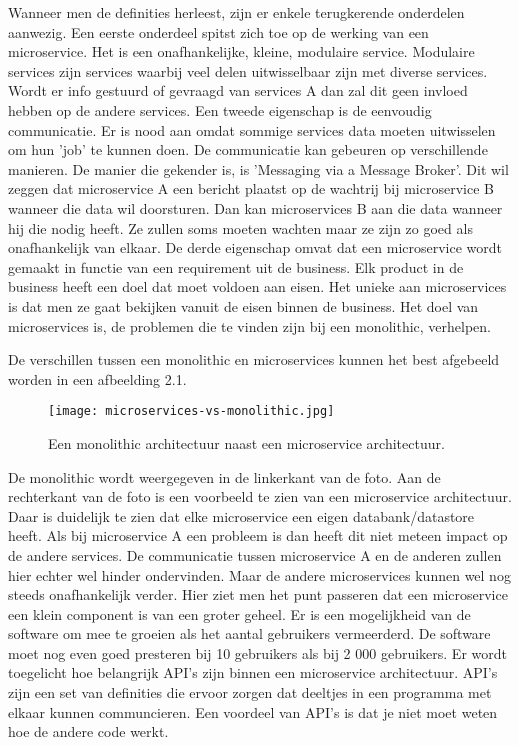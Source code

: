  Wanneer men de definities herleest, zijn er enkele terugkerende onderdelen aanwezig. Een eerste onderdeel spitst zich toe op de  werking van een microservice. Het is een onafhankelijke, kleine, modulaire service. Modulaire services zijn services waarbij veel delen uitwisselbaar zijn met diverse services. Wordt er info gestuurd of gevraagd van services A dan zal dit geen invloed hebben op de andere services. Een tweede eigenschap is de eenvoudig communicatie. Er is nood aan omdat sommige services data moeten uitwisselen om hun 'job' te kunnen doen. De communicatie kan gebeuren op verschillende manieren. De manier die gekender is, is 'Messaging via a Message Broker'. Dit wil zeggen dat microservice A een bericht plaatst op de wachtrij bij microservice B wanneer die data wil doorsturen. Dan kan microservices B aan die data wanneer hij die nodig heeft. Ze zullen soms moeten wachten maar ze zijn zo goed als onafhankelijk van elkaar. De derde eigenschap omvat dat een microservice wordt gemaakt in functie van een requirement uit de business. Elk product in de business heeft een doel dat moet voldoen aan eisen. Het unieke aan microservices is dat  men  ze gaat bekijken vanuit de eisen binnen de business. Het doel van microservices is, de problemen die te vinden zijn bij een monolithic, verhelpen. 
 
 De verschillen tussen een monolithic en microservices kunnen het best afgebeeld worden in een afbeelding 2.1.

\begin{figure}[h]
	\texttt{[image: microservices-vs-monolithic.jpg]}
	\centering
	\caption{Een monolithic architectuur naast een microservice architectuur. \textcite{Watts2018}}
\end{figure}
 De monolithic wordt  weergegeven in de linkerkant van de foto. Aan de rechterkant van de foto is een voorbeeld te zien van een microservice architectuur. Daar is duidelijk te zien dat elke microservice een eigen databank/datastore heeft. 
 Als bij microservice A een probleem is dan heeft dit niet meteen impact op de andere services. De communicatie tussen microservice A en de anderen zullen hier echter wel hinder ondervinden. Maar de andere microservices kunnen wel nog steeds onafhankelijk verder. 
 Hier ziet men het punt passeren dat een microservice een klein component is van een groter geheel.
 Er is een mogelijkheid van de software om mee te groeien als het aantal gebruikers vermeerderd. De software moet nog even goed presteren bij 10 gebruikers als bij 2 000 gebruikers. Er wordt toegelicht hoe belangrijk API's zijn binnen een microservice architectuur. API's zijn een set van definities die ervoor zorgen dat deeltjes in een programma met elkaar kunnen communcieren. Een voordeel van API's is dat je niet moet  weten hoe de andere code werkt.

